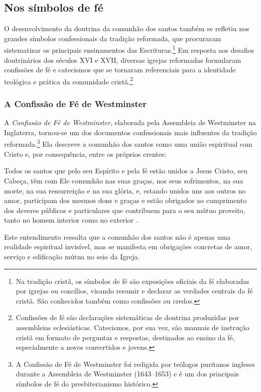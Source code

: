 \subsection{Nos símbolos de fé}

O desenvolvimento da doutrina da comunhão dos santos também se refletiu nos grandes símbolos confessionais da tradição reformada, que procuraram sistematizar os principais ensinamentos das Escrituras.\footnote{Na tradição cristã, os símbolos de fé são exposições oficiais da fé elaboradas por igrejas ou concílios, visando resumir e declarar as verdades centrais da fé cristã. São conhecidos também como confissões ou credos.} Em resposta aos desafios doutrinários dos séculos XVI e XVII, diversas igrejas reformadas formularam confissões de fé e catecismos que se tornaram referenciais para a identidade teológica e prática da comunidade cristã.\footnote{Confissões de fé são declarações sistemáticas de doutrina produzidas por assembleias eclesiásticas. Catecismos, por sua vez, são manuais de instrução cristã em formato de perguntas e respostas, destinados ao ensino da fé, especialmente a novos convertidos e jovens.}

\subsubsection{A Confissão de Fé de Westminster} 
A \textit{Confissão de Fé de Westminster}, elaborada pela Assembleia de Westminster na Inglaterra, tornou-se um dos documentos confessionais mais influentes da tradição reformada.\footnote{A Confissão de Fé de Westminster foi redigida por teólogos puritanos ingleses durante a Assembleia de Westminster (1643–1653) e é um dos principais símbolos de fé do presbiterianismo histórico.} Ela descreve a comunhão dos santos como uma união espiritual com Cristo e, por consequência, entre os próprios crentes:
\begin{citacao}
Todos os santos que pelo seu Espírito e pela fé estão unidos a Jesus Cristo, seu Cabeça, têm com Ele comunhão nas suas graças, nos seus sofrimentos, na sua morte, na sua ressurreição e na sua glória, e, estando unidos uns aos outros no amor, participam dos mesmos dons e graças e estão obrigados ao cumprimento dos deveres públicos e particulares que contribuem para o seu mútuo proveito, tanto no homem interior como no exterior \cite[Cap. XXVI, § 1º]{cfw}.
\end{citacao}

Este entendimento ressalta que a comunhão dos santos não é apenas uma realidade espiritual invisível, mas se manifesta em obrigações concretas de amor, serviço e edificação mútua no seio da Igreja.

